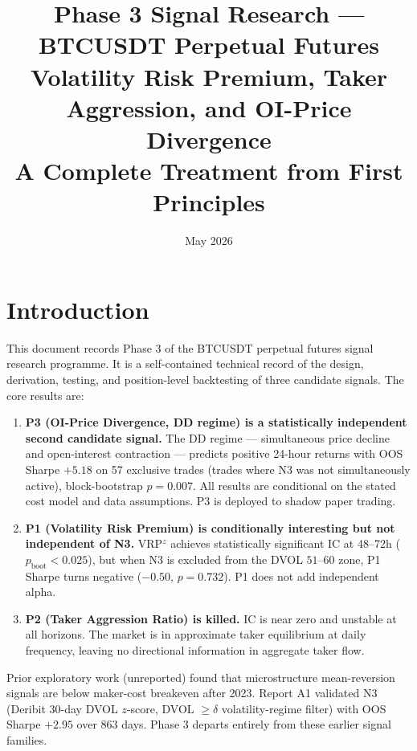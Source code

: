 \documentclass[12pt, a4paper]{article}
\title{\textbf{Phase 3 Signal Research --- BTCUSDT Perpetual Futures}\\[0.4em]
\large Volatility Risk Premium, Taker Aggression, and OI-Price Divergence\\[0.3em]
\large A Complete Treatment from First Principles}
\author{}
\date{May 2026}
\theoremstyle{plain}
\theoremstyle{definition}
\begin{document}
\maketitle
\tableofcontents
\newpage

\section{Introduction}

This document records Phase 3 of the BTCUSDT perpetual futures signal
research programme.  It is a self-contained technical record of the
design, derivation, testing, and position-level backtesting of three
candidate signals.  The core results are:

\begin{enumerate}
  \item \textbf{P3 (OI-Price Divergence, DD regime) is a statistically
        independent second candidate signal.}  The DD regime --- simultaneous
        price decline and open-interest contraction --- predicts positive
        24-hour returns with OOS Sharpe $+5.18$ on 57 exclusive trades
        (trades where N3 was not simultaneously active), block-bootstrap
        $p = 0.007$.  All results are conditional on the stated cost model
        and data assumptions.  P3 is deployed to shadow paper trading.

  \item \textbf{P1 (Volatility Risk Premium) is conditionally interesting
        but not independent of N3.}  VRP$^z$ achieves statistically
        significant IC at 48--72h ($p_{\mathrm{boot}} < 0.025$), but when
        N3 is excluded from the DVOL $51$--$60$ zone, P1 Sharpe turns
        negative ($-0.50$, $p = 0.732$).  P1 does not add independent alpha.

  \item \textbf{P2 (Taker Aggression Ratio) is killed.}  IC is near zero
        and unstable at all horizons.  The market is in approximate taker
        equilibrium at daily frequency, leaving no directional information
        in aggregate taker flow.
\end{enumerate}

Prior exploratory work (unreported) found that microstructure mean-reversion
signals are below maker-cost breakeven after 2023.  Report A1 validated N3
(Deribit 30-day DVOL $z$-score, DVOL $\geq \delta$ volatility-regime filter) with OOS
Sharpe $+2.95$ over 863 days.  Phase 3 departs entirely from these earlier
signal families.
\end{document}
